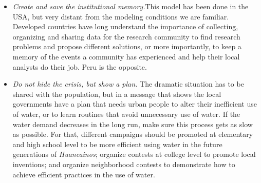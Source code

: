 \documentclass{article}
\begin{document}
\begin{itemize}
\item \emph{Create and save the institutional memory.}This model has been done in the USA, but very distant from the modeling conditions we are familiar. Developed countries have long understand the importance of collecting, organizing and sharing data for the research community to find research problems and propose different solutions, or more importantly, to keep a memory of the events a community has experienced and help their local analysts do their job. Peru is the opposite. 

\item \emph{Do not hide the crisis, but show a plan.} The dramatic situation has to be shared with the population, but in a message that shows the local governments have a plan that needs urban people to alter their inefficient use of water, or to learn routines that avoid unnecessary use of water. If the water demand decreases in the long run, make sure this process gets as slow as possible. For that, different campaigns should be promoted at elementary and high school level to be more efficient using water in the future generations of \emph{Huancainos}; organize contests at college level to promote local inventions; and organize neighborhood contests to demonstrate how to achieve efficient practices in the use of water.


\end{itemize}
\end{document}
